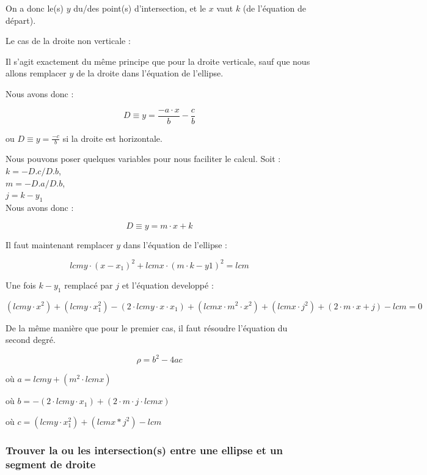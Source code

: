 \documentclass[]{report}
\begin{document}
On a donc le(s) $y$ du/des point(s) d'intersection, et le $x$
vaut $k$ (de l'équation de départ).


Le cas de la droite non verticale : 

Il s'agit exactement du même principe que pour la droite verticale, sauf que nous 
allons remplacer $y$ de la droite dans l'équation de l'ellipse.

Nous avons donc : 

$$ D \equiv y = \frac{-a \cdot x}{b} - \frac{c}{b} $$

ou $ D \equiv y = \frac{-c}{b} $ si la droite est horizontale.

Nous pouvons poser quelques variables pour nous faciliter le calcul. Soit : \\
$k = -D.c / D.b $, \\
$m = -D.a / D.b $, \\
$j = k - y_1$      \\

Nous avons donc :

$$ D \equiv y = m \cdot x + k $$

Il faut maintenant remplacer $y$ dans l'équation de l'ellipse : 

$$ lcmy \cdot (x - x_1)^2 + lcmx \cdot (m \cdot k - y1)^2 = lcm $$

Une fois $k - y_1$ remplacé par $j$ et l'équation developpé : 

$$  (lcmy \cdot x^2) + (lcmy \cdot x_1^2) - (2 \cdot lcmy \cdot x \cdot x_1) + (lcmx \cdot m^2 \cdot x^2) + (lcmx \cdot j^2) + (2 \cdot m \cdot x + j) - lcm = 0 $$

De la même manière que pour le premier cas, il faut résoudre l'équation du second degré.

$$ \rho = b^2 - 4ac$$

\begin{description}
\item où $ a = lcmy + (m^2 \cdot lcmx) $ 
\item où $ b = -(2 \cdot lcmy \cdot x_1) + (2 \cdot m \cdot j \cdot lcmx) $
\item où $ c = (lcmy \cdot x_1^2) + (lcmx * j^2) - lcm $
\end{description}

\subsubsection{Trouver la ou les intersection(s) entre une ellipse et un segment de droite}
\end{document}
